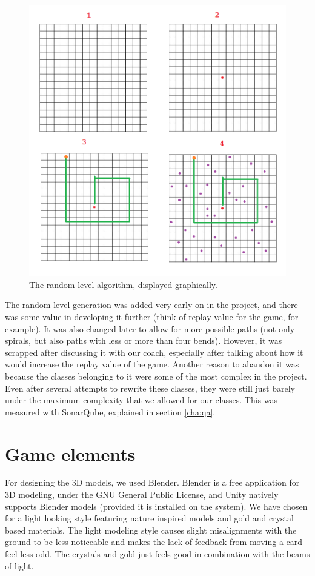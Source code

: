 			\begin{figure}[ht]
				\centering
				\includegraphics[scale = 0.4]{RandomLevelAlgorithm}
				\caption{The random level algorithm, displayed graphically.}
				\label{fig:random}
			\end{figure}
			
			The random level generation was added very early on in the project,
			and there was some value in developing it further (think of replay
			value for the game, for example). It was also changed later to
			allow for more possible paths (not only spirals, but also paths with
			less or more than four bends). However, it was scrapped after
			discussing it with our coach, especially after talking about how it
			would increase the replay value of the game. Another reason to abandon 
			it was because the classes belonging to it were some of the most complex
			in the project. Even after several attempts to rewrite these classes, 
			they were still just barely under the maximum complexity that we
			allowed for our classes. This was measured with SonarQube, explained
			in section \ref{cha:qa}.
			
	\section{Game elements} \label{sec:graphicaldesign}
		For designing the 3D models, we used Blender. Blender is a free 
		application for 3D modeling, under the GNU General Public License, and 
		Unity natively supports Blender models (provided it is installed on
		the system). We have chosen for a light looking style featuring nature 
		inspired models and gold and crystal based materials. The light modeling
		style causes slight misalignments with the ground to be less noticeable 
		and makes the lack of feedback from moving a card feel less odd. The 
		crystals and gold just feels good in combination with the beams of light.
		
